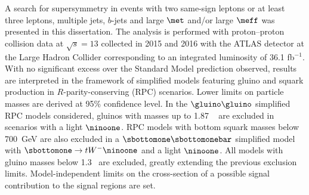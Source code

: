 A search for supersymmetry in events with two same-sign leptons or at least three leptons, multiple jets, 
$b$-jets and large $\met$ and/or large $\meff$ was presented in this dissertation. 
The analysis is performed with proton--proton collision data at $\sqrt{s}=13$ \TeV 
collected in 2015 and 2016 with the ATLAS detector at the Large Hadron Collider 
corresponding to an integrated luminosity of 36.1 fb$^{-1}$. 
With no significant excess over the Standard Model prediction observed,
results are interpreted in the framework of simplified models featuring gluino 
and squark production in $R$-parity-conserving (RPC) scenarios. Lower limits on particle 
masses are derived at 95\% confidence level. 
In the $\gluino\gluino$ simplified RPC models considered, gluinos with masses up to 1.87 \TeV~
are excluded in scenarios with a light $\ninoone$. RPC models with bottom squark masses below 700~GeV
are also excluded in a $\sbottomone\sbottomonebar$ simplified model with $\sbottomone\to tW^-\ninoone$ and a light $\ninoone$. 
All models with gluino masses below 1.3 \TeV~are excluded, greatly extending the previous exclusion limits.
Model-independent limits on the cross-section of a possible signal contribution to the signal regions are set.
